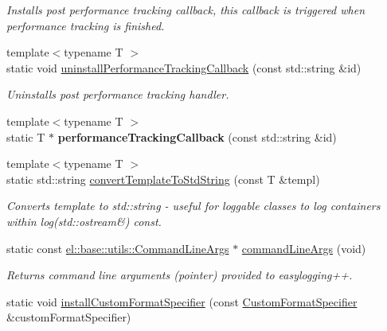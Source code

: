 \begin{DoxyCompactItemize}
\begin{DoxyCompactList}\small\item\em Installs post performance tracking callback, this callback is triggered when performance tracking is finished. \end{DoxyCompactList}\item 
{\footnotesize template$<$typename T $>$ }\\static void \hyperlink{classel_1_1Helpers_af1c5a4951991179dca4879ba05fb67a6}{uninstall\+Performance\+Tracking\+Callback} (const std\+::string \&id)\hypertarget{classel_1_1Helpers_af1c5a4951991179dca4879ba05fb67a6}{}\label{classel_1_1Helpers_af1c5a4951991179dca4879ba05fb67a6}

\begin{DoxyCompactList}\small\item\em Uninstalls post performance tracking handler. \end{DoxyCompactList}\item 
{\footnotesize template$<$typename T $>$ }\\static T $\ast$ {\bfseries performance\+Tracking\+Callback} (const std\+::string \&id)\hypertarget{classel_1_1Helpers_a007844d35095b26301c9218b29d74049}{}\label{classel_1_1Helpers_a007844d35095b26301c9218b29d74049}

\item 
{\footnotesize template$<$typename T $>$ }\\static std\+::string \hyperlink{classel_1_1Helpers_a8b032e32cd042ddc4fef4e814bad1082}{convert\+Template\+To\+Std\+String} (const T \&templ)\hypertarget{classel_1_1Helpers_a8b032e32cd042ddc4fef4e814bad1082}{}\label{classel_1_1Helpers_a8b032e32cd042ddc4fef4e814bad1082}

\begin{DoxyCompactList}\small\item\em Converts template to std\+::string -\/ useful for loggable classes to log containers within log(std\+::ostream\&) const. \end{DoxyCompactList}\item 
static const \hyperlink{classel_1_1base_1_1utils_1_1CommandLineArgs}{el\+::base\+::utils\+::\+Command\+Line\+Args} $\ast$ \hyperlink{classel_1_1Helpers_a83bab44f77a4961f8f5231e7ce9917bb}{command\+Line\+Args} (void)\hypertarget{classel_1_1Helpers_a83bab44f77a4961f8f5231e7ce9917bb}{}\label{classel_1_1Helpers_a83bab44f77a4961f8f5231e7ce9917bb}

\begin{DoxyCompactList}\small\item\em Returns command line arguments (pointer) provided to easylogging++. \end{DoxyCompactList}\item 
static void \hyperlink{classel_1_1Helpers_aa6de15a09db4f2a6763a6652c0ea12b1}{install\+Custom\+Format\+Specifier} (const \hyperlink{classel_1_1CustomFormatSpecifier}{Custom\+Format\+Specifier} \&custom\+Format\+Specifier)\hypertarget{classel_1_1Helpers_aa6de15a09db4f2a6763a6652c0ea12b1}{}\label{classel_1_1Helpers_aa6de15a09db4f2a6763a6652c0ea12b1}


\end{DoxyCompactItemize}
